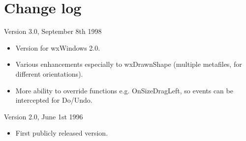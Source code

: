 \chapter{Change log}
%
\setfooter{\thepage}{}{}{}{}{\thepage}

Version 3.0, September 8th 1998

\begin{itemize}\itemsep=0pt
\item Version for wxWindows 2.0.
\item Various enhancements especially to wxDrawnShape
(multiple metafiles, for different orientations).
\item More ability to override functions e.g. OnSizeDragLeft, so events can be
intercepted for Do/Undo.
\end{itemize}

Version 2.0, June 1st 1996

\begin{itemize}\itemsep=0pt
\item First publicly released version.
\end{itemize}
